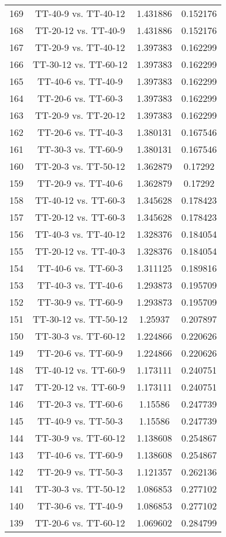 \documentclass[a4paper,10pt]{article}
\begin{document}
\begin{landscape}
\begin{table}[!htp]
\begin{tabular}{cccc}
169&TT-40-9 vs. TT-40-12&1.431886&0.152176\\
168&TT-20-12 vs. TT-40-9&1.431886&0.152176\\
167&TT-20-9 vs. TT-40-12&1.397383&0.162299\\
166&TT-30-12 vs. TT-60-12&1.397383&0.162299\\
165&TT-40-6 vs. TT-40-9&1.397383&0.162299\\
164&TT-20-6 vs. TT-60-3&1.397383&0.162299\\
163&TT-20-9 vs. TT-20-12&1.397383&0.162299\\
162&TT-20-6 vs. TT-40-3&1.380131&0.167546\\
161&TT-30-3 vs. TT-60-9&1.380131&0.167546\\
160&TT-20-3 vs. TT-50-12&1.362879&0.17292\\
159&TT-20-9 vs. TT-40-6&1.362879&0.17292\\
158&TT-40-12 vs. TT-60-3&1.345628&0.178423\\
157&TT-20-12 vs. TT-60-3&1.345628&0.178423\\
156&TT-40-3 vs. TT-40-12&1.328376&0.184054\\
155&TT-20-12 vs. TT-40-3&1.328376&0.184054\\
154&TT-40-6 vs. TT-60-3&1.311125&0.189816\\
153&TT-40-3 vs. TT-40-6&1.293873&0.195709\\
152&TT-30-9 vs. TT-60-9&1.293873&0.195709\\
151&TT-30-12 vs. TT-50-12&1.25937&0.207897\\
150&TT-30-3 vs. TT-60-12&1.224866&0.220626\\
149&TT-20-6 vs. TT-60-9&1.224866&0.220626\\
148&TT-40-12 vs. TT-60-9&1.173111&0.240751\\
147&TT-20-12 vs. TT-60-9&1.173111&0.240751\\
146&TT-20-3 vs. TT-60-6&1.15586&0.247739\\
145&TT-40-9 vs. TT-50-3&1.15586&0.247739\\
144&TT-30-9 vs. TT-60-12&1.138608&0.254867\\
143&TT-40-6 vs. TT-60-9&1.138608&0.254867\\
142&TT-20-9 vs. TT-50-3&1.121357&0.262136\\
141&TT-30-3 vs. TT-50-12&1.086853&0.277102\\
140&TT-30-6 vs. TT-40-9&1.086853&0.277102\\
139&TT-20-6 vs. TT-60-12&1.069602&0.284799\\

\end{tabular}
\end{table}
\end{landscape}
\end{document}
